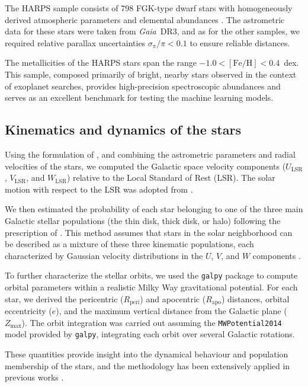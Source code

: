\documentclass{aa}
\begin{document}
\begin{appendix}
The HARPS sample consists of 798 FGK-type dwarf stars with homogeneously derived atmospheric parameters and elemental abundances \citep{Adibekyan-12, DelgadoMena-21}. The astrometric data for these stars were taken from \textit{Gaia}~DR3, and as for the other samples, we required relative parallax uncertainties $\sigma_\pi / \pi < 0.1$ to ensure reliable distances. 

The metallicities of the HARPS stars span the range $-1.0 < [\mathrm{Fe/H}] < 0.4$~dex. This sample, composed primarily of bright, nearby stars observed in the context of exoplanet searches, provides high-precision spectroscopic abundances and serves as an excellent benchmark for testing the machine learning models.


\subsection{Kinematics and dynamics of the stars}

Using the formulation of \citet{Johnson-87}, and combining the astrometric parameters and radial velocities of the stars, we computed the Galactic space velocity components ($U_{\mathrm{LSR}}$, $V_{\mathrm{LSR}}$, and $W_{\mathrm{LSR}}$) relative to the Local Standard of Rest (LSR). The solar motion with respect to the LSR was adopted from \citet{Schonrich-10}. 

We then estimated the probability of each star belonging to one of the three main Galactic stellar populations (the thin disk, thick disk, or halo) following the prescription of \citet{Reddy-06}. This method assumes that stars in the solar neighborhood can be described as a mixture of these three kinematic populations, each characterized by Gaussian velocity distributions in the $U$, $V$, and $W$ components \citep{Schwarzschild-1907}. 

To further characterize the stellar orbits, we used the \texttt{galpy} package \citep{Bovy-15} to compute orbital parameters within a realistic Milky Way gravitational potential. For each star, we derived the pericentric ($R_{\mathrm{peri}}$) and apocentric ($R_{\mathrm{apo}}$) distances, orbital eccentricity ($e$), and the maximum vertical distance from the Galactic plane ($Z_{\mathrm{max}}$). The orbit integration was carried out assuming the \texttt{MWPotential2014} model provided by \texttt{galpy}, integrating each orbit over several Galactic rotations. 

These quantities provide insight into the dynamical behaviour and population membership of the stars, and the methodology has been extensively applied in previous works \citep[e.g.,][]{Adibekyan-12}.




\end{appendix}
\end{document}
